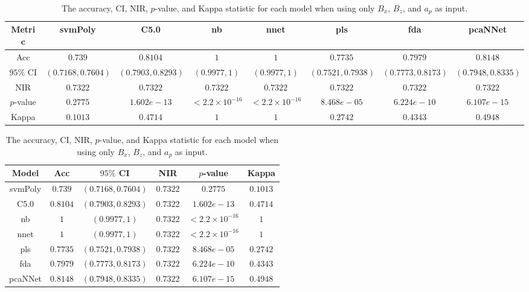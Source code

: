 \begin{table}[!ht]
	\centering
	\begin{tabular}{|c|c|c|c|c|c|c|c|}
		\hline
		Metric & svmPoly & C5.0 & nb & nnet & pls & fda & pcaNNet \\ \hline
		Acc & $0.739$ & $0.8104$ & $1$ & $1$ & $0.7735$ & $0.7979$ & $0.8148$ \\ \hline
		$95\%$ CI & $(0.7168, 0.7604)$ & $(0.7903, 0.8293)$ & $(0.9977, 1)$ & $(0.9977, 1)$ & $(0.7521, 0.7938)$ & $(0.7773, 0.8173)$ & $(0.7948, 0.8335)$ \\ \hline
		NIR & $0.7322$ & $0.7322$ & $0.7322$ & $0.7322$ & $0.7322$ & $0.7322$ & $0.7322$ \\ \hline
		$p$-value & $0.2775$ & $1.602e-13$ & $< 2.2 \times {10}^{-16}$ & $< 2.2 \times {10}^{-16}$ & $8.468e-05$ & $6.224e-10$ & $6.107e-15$ \\ \hline
		Kappa & $0.1013$ & $0.4714$ & $1$ & $1$ & $0.2742$ & $0.4343$ & $0.4948$ \\ \hline
	\end{tabular}
	\caption{The accuracy, CI, NIR, $p$-value, and Kappa statistic for each model when using only $B_{x}$, $B_{z}$, and $a_{p}$ as input.}
	\label{tab:stats:xzap}
\end{table}

\begin{table}[!ht]
	\centering
	\begin{tabular}{|c|c|c|c|c|c|}
		\hline
		Model & Acc & $95\%$ CI & NIR & $p$-value & Kappa \\ \hline
		svmPoly & $0.739$ & $(0.7168, 0.7604)$ & $0.7322$ & $0.2775$ & $0.1013$ \\ \hline
		C5.0 & $0.8104$ & $(0.7903, 0.8293)$ & $0.7322$ & $1.602e-13$ & $0.4714$ \\ \hline
		nb & $1$ & $(0.9977, 1)$ & $0.7322$ & $< 2.2 \times {10}^{-16}$ & $1$ \\ \hline
		nnet & $1$ & $(0.9977, 1)$ & $0.7322$ & $< 2.2 \times {10}^{-16}$ & $1$ \\ \hline
		pls & $0.7735$ & $(0.7521, 0.7938)$ & $0.7322$ & $8.468e-05$ & $0.2742$ \\ \hline
		fda & $0.7979$ & $(0.7773, 0.8173)$ & $0.7322$ & $6.224e-10$ & $0.4343$ \\ \hline
		pcaNNet & $0.8148$ & $(0.7948, 0.8335)$ & $0.7322$ & $6.107e-15$ & $0.4948$ \\ \hline
	\end{tabular}
	\caption{The accuracy, CI, NIR, $p$-value, and Kappa statistic for each model when using only $B_{x}$, $B_{z}$, and $a_{p}$ as input.}
	\label{tab:stats:reverse:xzap}
\end{table}

